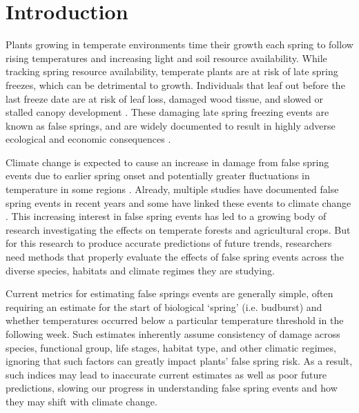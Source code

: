 \documentclass{article}\usepackage[]{graphicx}\usepackage[]{color}
\begin{document}
\section{Introduction}

Plants growing in temperate environments time their growth each spring to follow rising temperatures and increasing light and soil resource availability. While tracking spring resource availability, temperate plants are at risk of late spring freezes, which can be detrimental to growth. Individuals that leaf out before the last freeze date are at risk of leaf loss, damaged wood tissue, and slowed or stalled canopy development \citep{Gu2008, Hufkens2012}. These damaging late spring freezing events are known as false springs, and are widely documented to result in highly adverse ecological and economic consequences \citep{Knudson2012, Ault2013}.

Climate change is expected to cause an increase in damage from false spring events due to earlier spring onset and potentially greater fluctuations in temperature in some regions \citep{Cannell1986, Inouye2008, Martin2010}. Already, multiple studies have documented false spring events in recent years \citep{Gu2008, Augspurger2009, Knudson2012, Augspurger2013} and some have linked these events to climate change \citep{Ault2013, Allstadt2015, Muffler2016, Xin2016}. This increasing interest in false spring events has led to a growing body of research investigating the effects on temperate forests and agricultural crops. But for this research to produce accurate predictions of future trends, researchers need methods that properly evaluate the effects of false spring events across the diverse species, habitats and climate regimes they are studying. 

Current metrics for estimating false springs events are generally simple, often requiring an estimate for the start of biological `spring' (i.e. budburst) and whether temperatures occurred below a particular temperature threshold in the following week. Such estimates inherently assume consistency of damage across species, functional group, life stages, habitat type, and other climatic regimes, ignoring that such factors can greatly impact plants' false spring risk. As a result, such indices may lead to inaccurate current estimates as well as poor future predictions, slowing our progress in understanding false spring events and how they may shift with climate change. 
\end{document}
